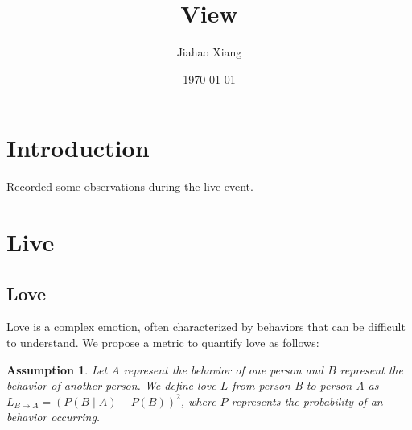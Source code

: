 \documentclass{article}
\title{View}
\author{Jiahao Xiang}
\date{\today}
\newtheorem{assumption}{Assumption}
\begin{document}
\maketitle

\section{Introduction}
Recorded some observations during the live event.

\section{Live}
\subsection{Love}
Love is a complex emotion, often characterized by behaviors that can be difficult to understand. We propose a metric to quantify love as follows:

\begin{assumption}
    Let $A$ represent the behavior of one person and $B$ represent the behavior of another person. We define love $L$ from person B to person A as $L_{B\to A}=(P(B\mid A)-P(B))^2$, where $P$ represents the probability of an behavior occurring.
\end{assumption}
\end{document}

